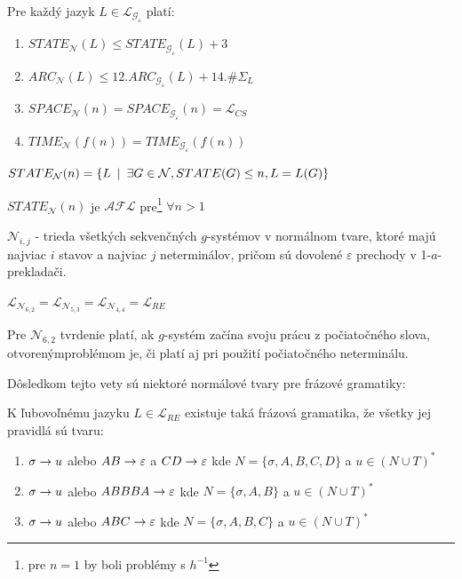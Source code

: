 \begin{dosledok}
Pre každý jazyk $L\in\mathcal{L}_{\mathcal{G}_{\varepsilon}}$
platí:
\begin{enumerate}
  \item $STATE_{\mathcal{N}}(L)\leq STATE_{\mathcal{G}_{\mathcal{\varepsilon}}}(L)+3$
  \item $ARC_{\mathcal{N}}(L)\leq 12.ARC_{\mathcal{G}_{\varepsilon}}(L)+14.\#\Sigma_L$
  \item $SPACE_{\mathcal{N}}(n)=SPACE_{\mathcal{G}_{\varepsilon}}(n)=\mathcal{L}_{CS}$
  \item $TIME_{\mathcal{N}}(f(n))=TIME_{\mathcal{G}_{\varepsilon}}(f(n))$
\end{enumerate}
\end{dosledok}

\begin{oznacenie}
$STATE_{\mathcal{N}}(n)=\{ L\enspace |\enspace\exists G\in\mathcal{N}, STATE(G)\leq n, L=L(G)\}$
\end{oznacenie}

\begin{veta}
$STATE_{\mathcal{N}}(n)$ je $\mathcal{AFL}$ pre\footnote{pre $n=1$ by boli problémy s
$h^{-1}$} $\forall n>1$
\end{veta}

\begin{oznacenie}
$\mathcal{N}_{i,j}$ - trieda všetkých sekvenčných $g$-systémov v
normálnom tvare, ktoré majú najviac $i$ stavov a najviac $j$
neterminálov, pričom sú dovolené $\varepsilon$ prechody v
1-$a$-prekladači.
\end{oznacenie}

\pagebreak

\begin{veta}
$\mathcal{L}_{\mathcal{N}_{6,2}}=\mathcal{L}_{\mathcal{N}_{5,3}}=\mathcal{L}_{\mathcal{N}_{4,4}}=\mathcal{L}_{RE}$
\end{veta}

Pre $\mathcal{N}_{6,2}$ tvrdenie platí, ak $g$-systém začína svoju
prácu z počiatočného slova, otvoreným\linebreak problémom je, či
platí aj pri použití počiatočného neterminálu.

\medskip
Dôsledkom tejto vety sú niektoré normálové tvary pre frázové
gramatiky:

\begin{dosledok}
K ľubovoľnému jazyku $L\in\mathcal{L}_{RE}$ existuje taká frázová
gramatika, že všetky jej pravidlá sú tvaru:
\begin{enumerate}
  \item $\sigma\rightarrow u$ alebo $AB\rightarrow\varepsilon$ a $CD\rightarrow\varepsilon$ kde $N=\{\sigma
  ,A,B,C,D\}$ a $u\in (N\cup T)^*$
  \item $\sigma\rightarrow u$ alebo $ABBBA\rightarrow\varepsilon$ kde $N=\{\sigma ,A,B\}$ a $u\in (N\cup T)^*$
  \item $\sigma\rightarrow u$ alebo $ABC\rightarrow\varepsilon$ kde $N=\{\sigma ,A,B,C\}$ a $u\in (N\cup T)^*$
\end{enumerate}
\end{dosledok}

